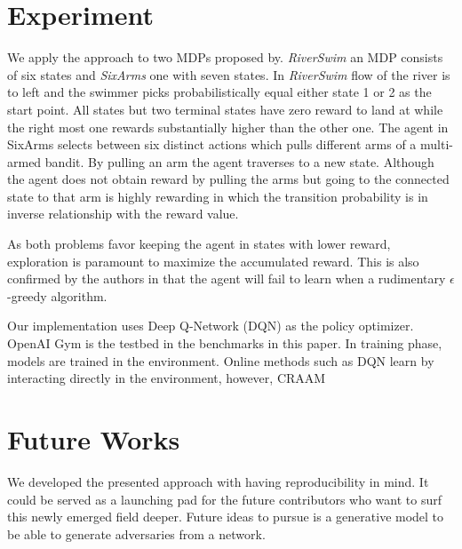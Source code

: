 \documentclass{article}
\begin{document}
    \section{Experiment}
    We apply the approach to two MDPs proposed by\cite{Strehl2004}. \textit{RiverSwim} an MDP consists of six states and \textit{SixArms} one with seven states. In \textit{RiverSwim} flow of the river is to left and the swimmer picks probabilistically equal either state 1 or 2 as the start point. All states but two terminal states have zero reward to land at while the right most one rewards substantially higher than the other one. The agent in SixArms selects between six distinct actions which pulls different arms of a multi-armed bandit. By pulling an arm the agent traverses to a new state. Although the agent does not obtain reward by pulling the arms but going to the connected state to that arm is highly rewarding in which the transition probability is in inverse relationship with the reward value.

    As both problems favor keeping the agent in states with lower reward, exploration is paramount to maximize the accumulated reward. This is also confirmed by the authors in \cite{Strehl2004} that the agent will fail to learn when a rudimentary $\epsilon$-greedy algorithm.

    Our implementation uses Deep Q-Network (DQN)\cite{Mnih2015} as the policy optimizer. OpenAI Gym \cite{Brockman2016} is the testbed in the benchmarks in this paper. In training phase, models are trained in the environment. Online methods such as DQN learn by interacting directly in the environment, however, CRAAM




    \section{Future Works}
    We developed the presented approach with having reproducibility in mind. It could be served as a launching pad for the future contributors who want to surf this newly emerged field deeper. Future ideas to pursue is a generative model to be able to generate adversaries from a network.
\end{document}
